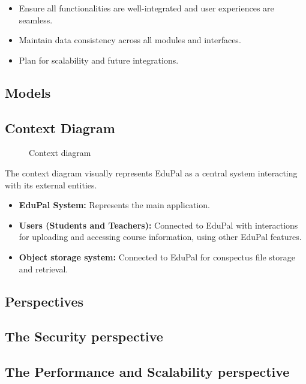 \begin{itemize}
    \item Ensure all functionalities are well-integrated and user experiences are seamless.
    \item Maintain data consistency across all modules and interfaces.
    \item Plan for scalability and future integrations.
\end{itemize}

\subsection{Models}
\subsection*{Context Diagram}

\begin{figure}[H]
    \caption{Context diagram}
    \label{context-view-context-diagram}
\end{figure}

The context diagram visually represents EduPal as a central system interacting with its external entities.

\begin{itemize}
    \item \textbf{EduPal System:} Represents the main application.
    \item \textbf{Users (Students and Teachers):} Connected to EduPal with interactions for uploading and accessing course information, using other EduPal features.
    \item \textbf{Object storage system:} Connected to EduPal for conspectus file storage and retrieval.
\end{itemize}


\subsection{Perspectives}


\subsection*{The Security perspective}


\subsection*{The Performance and Scalability perspective}


